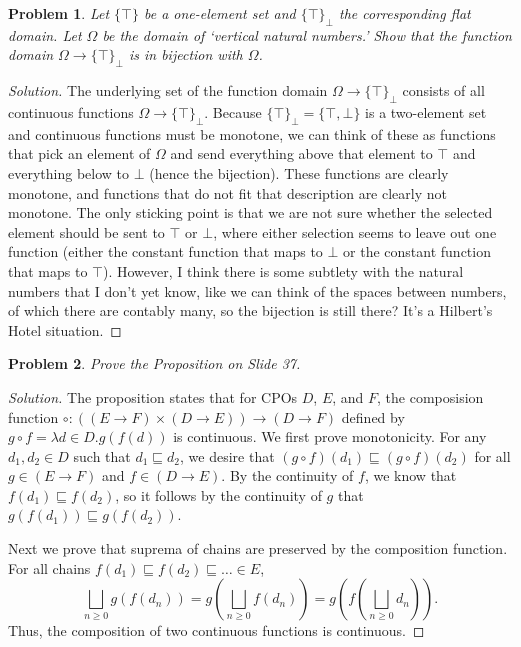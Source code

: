 \documentclass{article}
\newtheorem{problem}{Problem}[section]}
\newcommand{\f}{\rightarrow}
\begin{document}
\begin{problem}
    Let $\{\top\}$ be a one-element set and $\{\top\}_\bot$ the corresponding
    flat domain. Let $\Omega$ be the domain of `vertical natural numbers.' Show
    that the function domain $\Omega\rightarrow\{\top\}_\bot$ is in bijection
    with $\Omega$.
\end{problem}
\begin{proof}[Solution]
    The underlying set of the function domain $\Omega\rightarrow\{\top\}_\bot$
    consists of all continuous functions $\Omega\rightarrow\{\top\}_\bot$.
    Because $\{\top\}_\bot=\{\top,\bot\}$ is a two-element set and continuous
    functions must be monotone, we can think of these as functions that pick an
    element of $\Omega$ and send everything above that element to $\top$ and
    everything below to $\bot$ (hence the bijection). These functions are
    clearly monotone, and functions that do not fit that description are clearly
    not monotone. The only sticking point is that we are not sure whether the
    selected element should be sent to $\top$ or $\bot$, where either selection
    seems to leave out one function (either the constant function that maps to
    $\bot$ or the constant function that maps to $\top$). However, I think there
    is some subtlety with the natural numbers that I don't yet know, like we can
    think of the spaces between numbers, of which there are contably many, so
    the bijection is still there? It's a Hilbert's Hotel situation.
\end{proof}

\begin{problem}
    Prove the Proposition on Slide 37.
\end{problem}
\begin{proof}[Solution]
    The proposition states that for CPOs $D$, $E$, and $F$, the composision
    function $\circ : ((E\f F)\times (D\f E))\longrightarrow (D\f F)$ defined by
    $g\circ f = \lambda d\in D.g(f(d))$ is continuous. We first prove
    monotonicity. For any $d_1,d_2\in D$ such that $d_1\sqsubseteq d_2$, we
    desire that $(g\circ f)(d_1)\sqsubseteq (g\circ f)(d_2)$ for all $g\in (E\f
    F)$ and $f\in (D\f E)$. By the continuity of $f$, we know that
    $f(d_1)\sqsubseteq f(d_2)$, so it follows by the continuity of $g$ that
    $g(f(d_1))\sqsubseteq g(f(d_2))$.

    Next we prove that suprema of chains are preserved by the composition
    function. For all chains $f(d_1)\sqsubseteq f(d_2)\sqsubseteq\dots\in E$,
    \[
        \bigsqcup_{n\geq 0}g(f(d_n)) = g(\bigsqcup_{n\geq 0}f(d_n))
        =g (f (\bigsqcup_{n\geq 0}d_n)).
    \]
    Thus, the composition of two continuous functions is continuous.
\end{proof}
\end{document}
